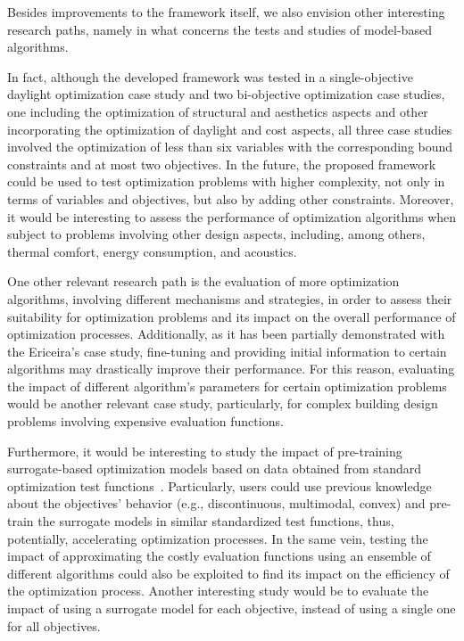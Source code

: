 Besides improvements to the framework itself, we also envision other interesting research paths, namely in what concerns the tests and studies of model-based algorithms. 

In fact, although the developed framework was tested in a single-objective daylight optimization case study and two bi-objective optimization case studies, one including the optimization of structural and aesthetics aspects and other incorporating the optimization of daylight and cost aspects, all three case studies involved the optimization of less than six variables with the corresponding bound constraints and at most two objectives. In the future, the proposed framework could be used to test optimization problems with higher complexity, not only in terms of variables and objectives, but also by adding other constraints. Moreover, it would be interesting to assess the performance of optimization algorithms when subject to problems involving other design aspects, including, among others, thermal comfort, energy consumption, and acoustics. 
 
One other relevant research path is the evaluation of more optimization algorithms, involving different mechanisms and strategies, in order to assess their suitability for optimization problems and its impact on the overall performance of optimization processes. Additionally, as it has been partially demonstrated with the Ericeira's case study, fine-tuning and providing initial information to certain algorithms may drastically improve their performance. For this reason, evaluating the impact of different algorithm's parameters for certain optimization problems would be another relevant case study, particularly, for complex building design problems involving expensive evaluation functions. 

Furthermore, it would be interesting to study the impact of pre-training surrogate-based optimization models based on data obtained from standard optimization test functions~\cite{Zhang2009TEST}. Particularly, users could use previous knowledge about the objectives' behavior (e.g., discontinuous, multimodal, convex) and pre-train the surrogate models in similar standardized test functions, thus, potentially, accelerating optimization processes. In the same vein, testing the impact of approximating the costly evaluation functions using an ensemble of different algorithms could also be exploited to find its impact on the efficiency of the optimization process. %
Another interesting study would be to evaluate the impact of using a surrogate model for each objective, instead of using a single one for all objectives. 
